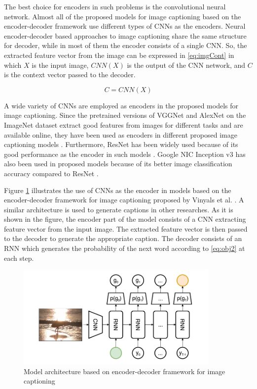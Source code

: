 \documentclass[preprint, 12pt]{elsarticle}
\begin{document}
		The best choice for encoders in such problems is the convolutional neural network. Almost all of the proposed models for image captioning based on the encoder-decoder framework use different types of CNNs as the encoders. Neural encoder-decoder based approaches to image captioning share the same structure for decoder, while in most of them the encoder consists of a single CNN. So, the extracted feature vector from the image can be expressed in \eqref{eq:imgCont} in which $X$ is the input image, $CNN(X)$ is the output of the CNN network, and $C$ is the context vector passed to the decoder.
		
		\begin{equation}
			C = CNN(X)
			\label{eq:imgCont}
		\end{equation} 
		
		A wide variety of CNNs are employed as encoders in the proposed models for image captioning. Since the pretrained versions of VGGNet \cite{simonyan2014very} and AlexNet \cite{krizhevsky2012imagenet} on the ImageNet dataset \cite{deng2009imagenet} extract good features from images for different tasks and are available online, they have been used as encoders in different proposed image captioning models \cite{karpathy2015deep} \cite{chen2017sca} \cite{pedersoli2017areas}. Furthermore, ResNet\cite{he2016deep} has been widely used because of its good performance as the encoder in such models \cite{lu2017knowing} \cite{rennie2017self} \cite{anderson2017bottom} \cite{yao2017boosting}. Google NIC Inception v3 \cite{szegedy2016rethinking} has also been used in proposed models because of its better image classification accuracy compared to ResNet \cite{zhang2017actor} \cite{ioffe2015batch} \cite{vinyals2015show} \cite{liu2017improved}. 
		
		Figure \ref{fig:imgCpt} illustrates the use of CNNs as the encoder in models based on the encoder-decoder framework for image captioning proposed by Vinyals et al. \cite{vinyals2015show}. A similar architecture is used to generate captions in other researches. As it is shown in the figure, the encoder part of the model consists of a CNN extracting feature vector from the input image. The extracted feature vector is then passed to the decoder to generate the appropriate caption. The decoder consists of an RNN which generates the probability of the next word according to \eqref{eq:obj2} at each step.
		
		\begin{figure}[h]
			\centering
			\includegraphics[scale=1]{Imgs/CNNImgCpt.png}
			\caption{Model architecture based on encoder-decoder framework for image captioning \cite{vinyals2015show}}
			\label{fig:imgCpt}
		\end{figure}
		
\end{document}
